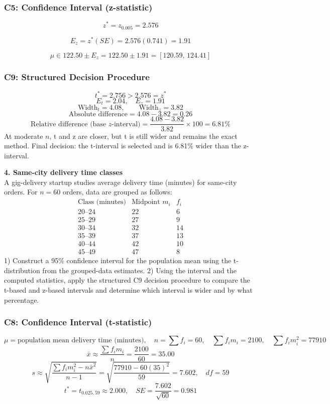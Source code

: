 \begin{ExamProblems}
		\subsubsection*{C5: Confidence Interval (z-statistic)}
		\[
		z^*=z_{0.005}=2.576
		\]

		\[
		E_z=z^*(SE)=2.576(0.741)=1.91
		\]

		\[
		\mu\in 122.50\pm E_z=122.50\pm 1.91=[120.59,\,124.41]
		\]

		\subsubsection*{C9: Structured Decision Procedure}
		\[
		t^*=2.756>2.576=z^*
		\]
		\[
		E_t=2.04,\quad E_z=1.91
		\]
		\[
		\text{Width}_t=4.08,\qquad \text{Width}_z=3.82
		\]
		\[
		\text{Absolute difference}=4.08-3.82=0.26
		\]
		\[
		\text{Relative difference (base }z\text{-interval)}=\frac{4.08-3.82}{3.82}\times 100=6.81\%
		\]
		At moderate $n$, t and z are closer, but t is still wider and remains the exact method.
		Final decision: the t-interval is selected and is 6.81\% wider than the z-interval.

		\newpage
		\item
		\textbf{4. Same-city delivery time classes}\\
		A gig-delivery startup studies average delivery time (minutes) for same-city orders.
		For $n=60$ orders, data are grouped as follows:
		\[
		\begin{array}{c|c|c}
		\text{Class (minutes)} & \text{Midpoint }m_i & f_i\\\hline
		20\text{--}24 & 22 & 6\\
		25\text{--}29 & 27 & 9\\
		30\text{--}34 & 32 & 14\\
		35\text{--}39 & 37 & 13\\
		40\text{--}44 & 42 & 10\\
		45\text{--}49 & 47 & 8
		\end{array}
		\]
		1) Construct a 95\% confidence interval for the population mean using the t-distribution from the grouped-data estimates.
		2) Using the interval and the computed statistics, apply the structured C9 decision procedure to compare the t-based and z-based intervals and determine which interval is wider and by what percentage.

		\subsubsection*{C8: Confidence Interval (t-statistic)}
		\[
		\mu=\text{population mean delivery time (minutes)},\quad n=\sum f_i=60,\quad \sum f_im_i=2100,\quad \sum f_im_i^2=77910
		\]
		\[
		\bar{x}\approx\frac{\sum f_im_i}{n}=\frac{2100}{60}=35.00
		\]
		\[
		s\approx\sqrt{\frac{\sum f_im_i^2-n\bar{x}^2}{n-1}}=\sqrt{\frac{77910-60(35)^2}{59}}=7.602,\quad df=59
		\]
		\[
		t^*=t_{0.025,59}\approx 2.000,\quad SE=\frac{7.602}{\sqrt{60}}=0.981
		\]


\end{ExamProblems}
